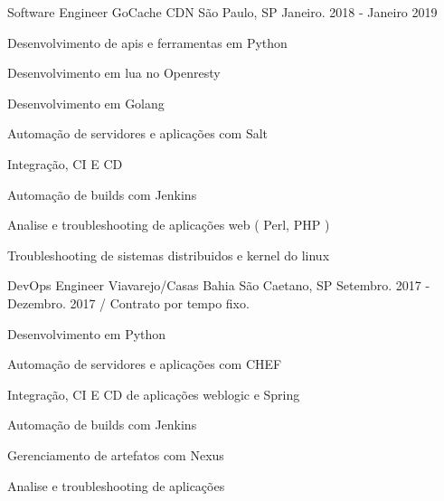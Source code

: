 \begin{cventries}
  \cventry
    {Software Engineer} %
    {GoCache CDN} %
    {São Paulo, SP} %
    {Janeiro. 2018 - Janeiro 2019} %
    {
      \begin{cvitems} %
       \item {Desenvolvimento de apis e ferramentas em Python}
       \item {Desenvolvimento em lua no Openresty}
       \item {Desenvolvimento em Golang}
       \item {Automação de servidores e aplicações com Salt}
       \item {Integração, CI E CD }
       \item {Automação de builds com Jenkins}
       \item {Analise e troubleshooting de aplicações web ( Perl, PHP )}
       \item {Troubleshooting de sistemas distribuidos e kernel do linux}
      \end{cvitems}
    }

  \cventry
    {DevOps Engineer} %
    {Viavarejo/Casas Bahia} %
    {São Caetano, SP} %
    {Setembro. 2017 - Dezembro. 2017 / Contrato por tempo fixo.} %
    {
      \begin{cvitems} %
        \item {Desenvolvimento em Python}
        \item {Automação de servidores e aplicações com CHEF}
    \item {Integração, CI E CD de aplicações weblogic e Spring}
	\item {Automação de builds com Jenkins}
	\item {Gerenciamento de artefatos com Nexus}
        \item {Analise e troubleshooting de aplicações}
      \end{cvitems}
    }



\end{cventries}
